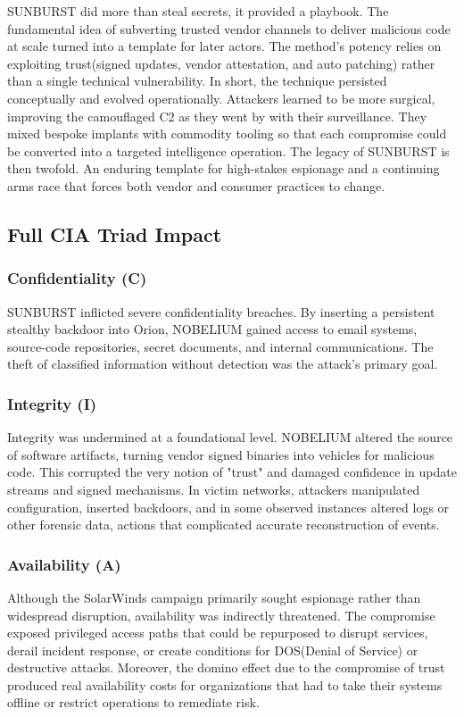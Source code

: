 \documentclass[conference]{IEEEtran}
\begin{document}
SUNBURST did more than steal secrets, it provided a playbook. The fundamental idea of subverting trusted vendor channels to deliver malicious code at
scale turned into a template for later actors. The method's potency relies on exploiting trust(signed updates, vendor attestation, and auto patching)
rather than a single technical vulnerability. In short, the technique persisted conceptually and evolved operationally. Attackers learned to be more
surgical, improving the camouflaged C2 as they went by with their surveillance. They mixed bespoke implants with commodity tooling so that each compromise
could be converted into a targeted intelligence operation. The legacy of SUNBURST is then twofold. An enduring template for high-stakes espionage and
a continuing arms race that forces both vendor and consumer practices to change.
\subsection{Full CIA Triad Impact}
\subsubsection*{Confidentiality (C)}
SUNBURST inflicted severe confidentiality breaches. By inserting a persistent stealthy backdoor into Orion, NOBELIUM gained access to email systems,
source-code repositories, secret documents, and internal communications. The theft of classified information without detection was the attack's primary
goal.
\subsubsection*{Integrity (I)}
Integrity was undermined at a foundational level. NOBELIUM altered the source of software artifacts, turning vendor signed binaries into vehicles
for malicious code. This corrupted the very notion of "trust" and damaged confidence in update streams and signed mechanisms. In victim networks,
attackers manipulated configuration, inserted backdoors, and in some observed instances altered logs or other forensic data, actions that complicated
accurate reconstruction of events.
\subsubsection*{Availability (A)}
Although the SolarWinds campaign primarily sought espionage rather than widespread disruption, availability was indirectly threatened. The compromise
exposed privileged access paths that could be repurposed to disrupt services, derail incident response, or create conditions for DOS(Denial of Service)
or destructive attacks. Moreover, the domino effect due to the compromise of trust produced real availability costs for organizations that had to take
their systems offline or restrict operations to remediate risk.
\end{document}
